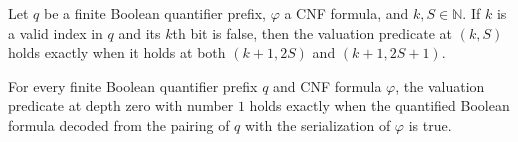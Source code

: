 \begin{theorem}
\label{Complexity.LogProg.TQBFARM.val_all}
\leanok
{}
Let $q$ be a finite Boolean quantifier prefix, $\varphi$ a CNF formula, and
$k,S\in\mathbb{N}$. If $k$ is a valid index in $q$ and its $k$th bit is false, then the
valuation predicate at $(k,S)$ holds exactly when it holds at both $(k+1,2S)$ and
$(k+1,2S+1)$.
\end{theorem}

\begin{theorem}
\label{Complexity.LogProg.TQBFARM.val_root}
\leanok
{}
For every finite Boolean quantifier prefix $q$ and CNF formula $\varphi$, the valuation
predicate at depth zero with number $1$ holds exactly when the quantified Boolean
formula decoded from the pairing of $q$ with the serialization of $\varphi$ is true.
\end{theorem}
